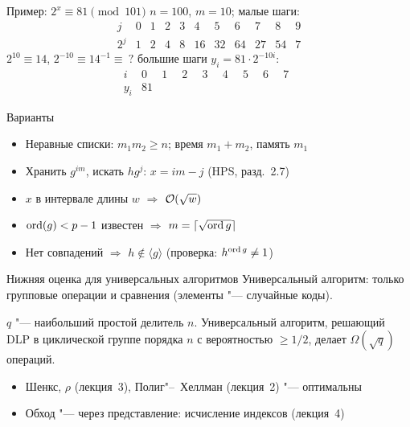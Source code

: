\documentclass{ca-slides}
\begin{document}
\begin{canvasframe}{Пример: $2^x \equiv 81 \pmod{101}$}
  $n = 100$, $m = 10$; малые шаги:
  \[
  \begin{array}{c|cccccccccc}
    j & 0 & 1 & 2 & 3 & 4 & 5 & 6 & 7 & 8 & 9 \\ \hline
    2^j & 1 & 2 & 4 & 8 & 16 & 32 & 64 & 27 & 54 & 7
  \end{array}
  \]
  $2^{10} \equiv 14$, \quad $2^{-10} \equiv 14^{-1} \equiv \ ?$ \quad большие шаги $y_i = 81 \cdot
  2^{-10 i}$:
  \[
  \begin{array}{c|cccccccc}
    i & 0 & 1 & 2 & 3 & 4 & 5 & 6 & 7 \\ \hline
    y_i & 81 & \phantom{00} & \phantom{00} & \phantom{00} & \phantom{00} & \phantom{00}
      & \phantom{00} & \phantom{00}
  \end{array}
  \]
\end{canvasframe}

\begin{canvasframe}{Варианты}
  \begin{itemize}
    \item Неравные списки: $m_1 m_2 \ge n$; время $m_1 + m_2$, память $m_1$
    \item Хранить $g^{im}$, искать $h g^{j}$: $x = im - j$ (HPS, разд.~2.7)
    \item $x$ в интервале длины $w$ $\Rightarrow$ $\mathcal{O}(\sqrt w)$
    \item $\operatorname{ord}(g) < p - 1$ известен $\Rightarrow$ $m = \lceil\sqrt{\operatorname{ord} g}\rceil$
    \item Нет совпадений $\Rightarrow$ $h \notin \langle g \rangle$ (проверка: $h^{\operatorname{ord} g} \ne 1$)
  \end{itemize}
  \penspace[0.15\textheight]
\end{canvasframe}

\begin{canvasframe}{Нижняя оценка для универсальных алгоритмов}
  \small
  Универсальный алгоритм: только групповые операции и сравнения (элементы "--- случайные коды).
  \begin{theorem}
    $q$ "--- наибольший простой делитель $n$. Универсальный алгоритм, решающий DLP в циклической
    группе порядка $n$ с вероятностью $\ge 1/2$, делает $\Omega(\sqrt q)$ операций.
  \end{theorem}
  \begin{itemize}
    \item Шенкс, $\rho$ (лекция~3), Полиг"--~Хеллман (лекция~2) "--- оптимальны
    \item Обход "--- через представление: исчисление индексов (лекция~4)
  \end{itemize}
\end{canvasframe}
\end{document}
